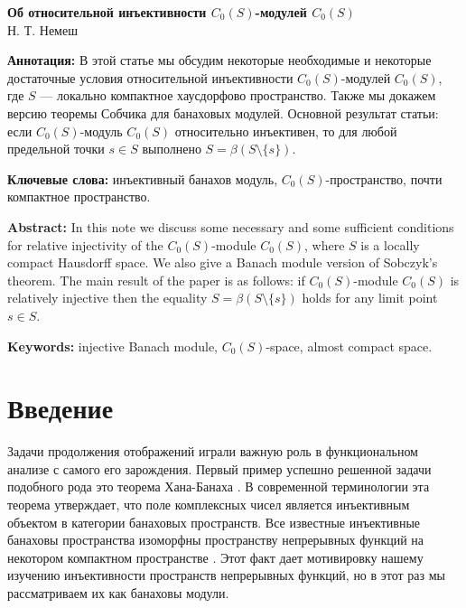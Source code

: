 \documentclass[12pt]{article}
\begin{document}
\begin{center}
    \Large \textbf{Об относительной инъективности $C_0(S)$-модулей $C_0(S)$}\\[0.5cm]
    \small {Н. Т. Немеш}\\[0.5cm]
\end{center}

\thispagestyle{empty}

\textbf{Аннотация:} В этой статье мы обсудим некоторые необходимые и некоторые достаточные условия относительной инъективности $C_0(S)$-модулей $C_0(S)$, где $S$ --- локально компактное хаусдорфово пространство. Также мы докажем версию теоремы Собчика для банаховых модулей. Основной результат статьи: если $C_0(S)$-модуль $C_0(S)$ относительно инъективен, то для любой предельной точки $s\in S$ выполнено $S=\beta(S\setminus\{s\})$.

\textbf{Ключевые слова:} инъективный банахов модуль, $C_0(S)$-пространство, почти компактное пространство.

\medskip
\textbf{Abstract:} In this note we discuss some necessary and some sufficient conditions for relative injectivity of the $C_0(S)$-module $C_0(S)$, where $S$ is a locally compact Hausdorff space. We also give a Banach module version of Sobczyk's theorem. The main result of the paper is as follows: if $C_0(S)$-module $C_0(S)$ is relatively injective then  the equality $S=\beta(S\setminus\{s\})$ holds for any limit point $s\in S$.
\medskip

\textbf{Keywords:} injective Banach module, $C_0(S)$-space, almost compact space.

\bigskip


\section{Введение}
\label{SectionIntroduction}

Задачи продолжения отображений играли важную роль в функциональном анализе с самого его зарождения. Первый пример успешно решенной задачи подобного рода это теорема Хана-Банаха \cite{HahnLinSystInLinSp,BanachOnLinFuncI,BanachOnLinFuncII}. В современной терминологии эта теорема утверждает, что поле комплексных чисел является инъективным объектом в категории банаховых пространств. Все известные инъективные банаховы пространства изоморфны пространству непрерывных функций на некотором компактном пространстве \cite{BlascIvorConstrInjSpCK}. Этот факт дает мотивировку нашему изучению инъективности пространств непрерывных функций, но в этот раз мы рассматриваем их как банаховы модули.
\end{document}
